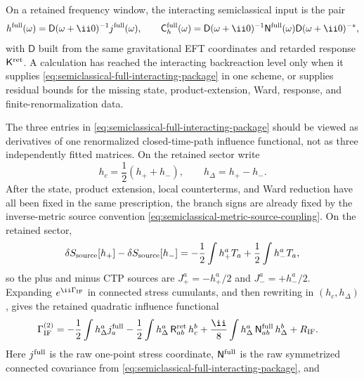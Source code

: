 \begin{controlledapproximation}
On a retained frequency window, the interacting semiclassical input is the
pair
\[
  h^{\rm full}(\omega)
  =
  \mathsf D(\omega+\ii0)^{-1}j^{\rm full}(\omega),
  \qquad
  \mathsf C_h^{\rm full}(\omega)
  =
  \mathsf D(\omega+\ii0)^{-1}
  \mathsf N^{\rm full}(\omega)
  \mathsf D(\omega+\ii0)^{-*},
\]
with \(\mathsf D\) built from the same gravitational EFT coordinates and
retarded response \(\mathsf K^{\rm ret}\).  A calculation has reached the
interacting backreaction level only when it supplies
\eqref{eq:semiclassical-full-interacting-package} in one scheme, or supplies
residual bounds for the missing state, product-extension, Ward, response, and
finite-renormalization data.
\end{controlledapproximation}

\begin{controlledapproximation}
\label{ca:semiclassical-interacting-influence-package}
The three entries in
\eqref{eq:semiclassical-full-interacting-package} should be viewed as
derivatives of one renormalized closed-time-path influence functional, not as
three independently fitted matrices.  On the retained sector write
\[
  h_c=\frac12(h_++h_-),
  \qquad
  h_\Delta=h_+-h_- .
\]
After the state, product extension, local counterterms, and Ward reduction have
all been fixed in the same prescription, the branch signs are already fixed by
the inverse-metric source convention
\eqref{eq:semiclassical-metric-source-coupling}.  On the retained sector,
\[
  \delta S_{\rm source}[h_+]-\delta S_{\rm source}[h_-]
  =
  -\frac12\int h_+^aT_a
  +
  \frac12\int h_-^aT_a,
\]
so the plus and minus CTP sources are
\(J_+^a=-h_+^a/2\) and \(J_-^a=+h_-^a/2\).  Expanding
\(e^{\ii\Gamma_{\rm IF}}\) in connected stress cumulants, and then rewriting in
\((h_c,h_\Delta)\), gives the retained quadratic influence functional
\begin{equation}
\begin{aligned}
  \Gamma_{\rm IF}^{(2)}
  &=
  -\frac12
  \int h_\Delta^a j_a^{\rm full}
  -\frac12
  \int h_\Delta^a\,
       \mathsf R^{\rm ret}_{ab}\,
       h_c^b
  +
  \frac{\ii}{8}
  \int h_\Delta^a\,
       \mathsf N_{ab}^{\rm full}\,
       h_\Delta^b
  +R_{\rm IF}.
\end{aligned}
  \label{eq:semiclassical-ctp-influence-package}
\end{equation}
Here \(j^{\rm full}\) is the raw one-point stress coordinate,
\(\mathsf N^{\rm full}\) is the raw symmetrized connected covariance from
\eqref{eq:semiclassical-full-interacting-package}, and

\end{controlledapproximation}
